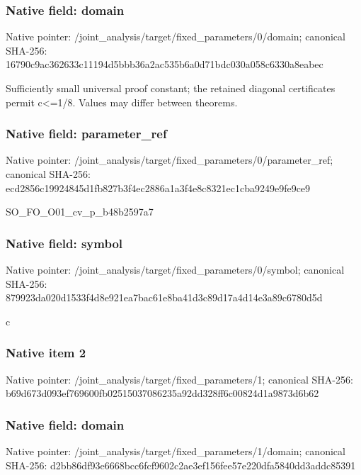 \documentclass[10pt,a4paper]{article}
\begin{document}
\subsubsection{Native field: domain}
Native pointer: /joint\_\allowbreak{}analysis/target/fixed\_\allowbreak{}parameters/0/domain; canonical SHA-256: 16790c9ac362633c11194d5bbb36a2ac535b6a0d71bdc030a058c6330a8eabec

\begingroup\raggedright\sloppy Sufficiently small universal proof constant;\allowbreak{} the retained diagonal certificates permit c<=\allowbreak{}1/\allowbreak{}8. Values may differ between theorems.\par\endgroup

\subsubsection{Native field: parameter\_\allowbreak{}ref}
Native pointer: /joint\_\allowbreak{}analysis/target/fixed\_\allowbreak{}parameters/0/parameter\_\allowbreak{}ref; canonical SHA-256: ecd2856c19924845d1fb827b3f4ec2886a1a3f4e8c8321ec1cba9249e9fe9ce9

\begingroup\raggedright\sloppy SO\_\allowbreak{}FO\_\allowbreak{}O01\_\allowbreak{}cv\_\allowbreak{}p\_\allowbreak{}b48b2597a7\par\endgroup

\subsubsection{Native field: symbol}
Native pointer: /joint\_\allowbreak{}analysis/target/fixed\_\allowbreak{}parameters/0/symbol; canonical SHA-256: 879923da020d1533f4d8e921ea7bac61e8ba41d3c89d17a4d14e3a89c6780d5d

\begingroup\raggedright\sloppy c\par\endgroup

\subsubsection{Native item 2}
Native pointer: /joint\_\allowbreak{}analysis/target/fixed\_\allowbreak{}parameters/1; canonical SHA-256: b69d673d093ef769600fb02515037086235a92dd328ff6c00824d1a9873d6b62

\subsubsection{Native field: domain}
Native pointer: /joint\_\allowbreak{}analysis/target/fixed\_\allowbreak{}parameters/1/domain; canonical SHA-256: d2bb86df93e6668bcc6fcf9602c2ae3ef156fee57e220dfa5840dd3addc85391
\end{document}
